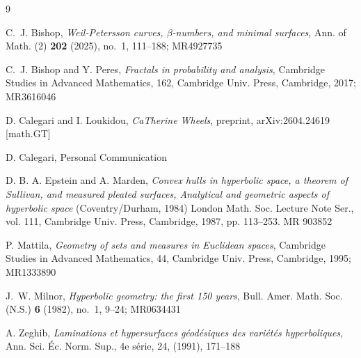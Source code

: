 \documentclass[11pt]{article}
\begin{document}
\begin{thebibliography}{9}

C.~J. Bishop, {\it Weil-Petersson curves, $\beta$-numbers, and minimal surfaces}, Ann. of Math. (2) {\bf 202} (2025), no.~1, 111--188; MR4927735

C.~J. Bishop and Y. Peres, {\it Fractals in probability and analysis}, Cambridge Studies in Advanced Mathematics, 162, Cambridge Univ. Press, Cambridge, 2017; MR3616046

D. Calegari and I. Loukidou, {\it CaTherine Wheels}, preprint, arXiv:2604.24619 [math.GT]

D. Calegari, Personal Communication

D. B. A. Epstein and A. Marden, {\it Convex hulls in hyperbolic space, a theorem of Sullivan, and measured pleated surfaces, Analytical and geometric aspects of hyperbolic space} (Coventry/Durham, 1984) London Math. Soc. Lecture Note Ser., vol. 111, Cambridge Univ. Press, Cambridge, 1987, pp. 113–253. MR 903852

P. Mattila, {\it Geometry of sets and measures in Euclidean spaces}, Cambridge Studies in Advanced Mathematics, 44, Cambridge Univ. Press, Cambridge, 1995; MR1333890

J.~W. Milnor, {\it Hyperbolic geometry: the first 150 years}, Bull. Amer. Math. Soc. (N.S.) {\bf 6} (1982), no.~1, 9--24; MR0634431


 A. Zeghib, {\it Laminations et hypersurfaces géodésiques des variétés hyperboliques}, Ann. Sci. Éc. Norm. Sup., 4e série, 24, (1991), 171–188

 \end{thebibliography} 
\end{document}
